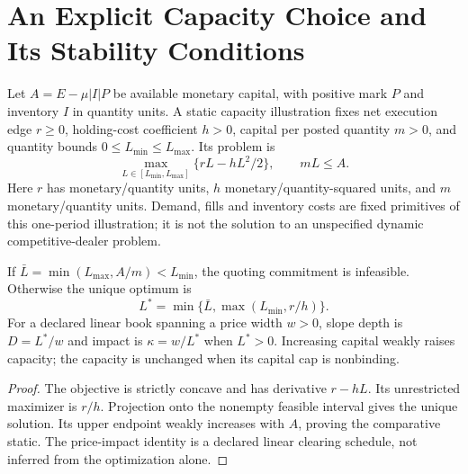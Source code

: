 \section{An Explicit Capacity Choice and Its Stability Conditions}
Let $A=E-\mu|I|P$ be available monetary capital, with positive mark $P$ and inventory $I$ in quantity units. A static capacity illustration fixes net execution edge $r\ge0$, holding-cost coefficient $h>0$, capital per posted quantity $m>0$, and quantity bounds $0\le L_{\min}\le L_{\max}$. Its problem is
\[
\max_{L\in[L_{\min},L_{\max}]}\{rL-hL^2/2\},\qquad mL\le A.
\]
Here $r$ has monetary/quantity units, $h$ monetary/quantity-squared units, and $m$ monetary/quantity units. Demand, fills and inventory costs are fixed primitives of this one-period illustration; it is not the solution to an unspecified dynamic competitive-dealer problem.
\begin{proposition}
If $\bar L=\min(L_{\max},A/m)<L_{\min}$, the quoting commitment is infeasible. Otherwise the unique optimum is
\[
L^*=\min\{\bar L,\max(L_{\min},r/h)\}.
\]
For a declared linear book spanning a price width $w>0$, slope depth is $D=L^*/w$ and impact is $\kappa=w/L^*$ when $L^*>0$. Increasing capital weakly raises capacity; the capacity is unchanged when its capital cap is nonbinding.
\end{proposition}
\begin{proof}
The objective is strictly concave and has derivative $r-hL$. Its unrestricted maximizer is $r/h$. Projection onto the nonempty feasible interval gives the unique solution. Its upper endpoint weakly increases with $A$, proving the comparative static. The price-impact identity is a declared linear clearing schedule, not inferred from the optimization alone.
\end{proof}

